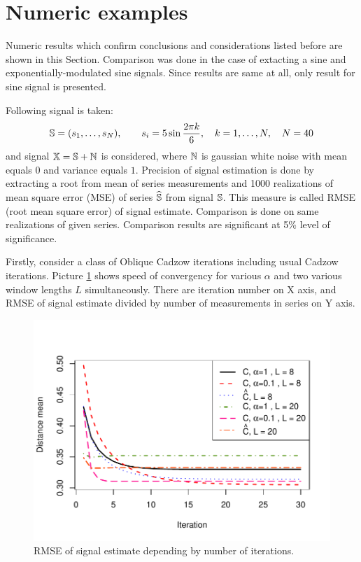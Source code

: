 \documentclass[12pt,a4paper,fleqn,leqno]{article}
\begin{document}
\section{Numeric examples}
\label{sec:simul}
Numeric results which confirm conclusions and considerations listed before are shown in this Section. Comparison was done in the case of extacting a sine and exponentially-modulated sine signals.
Since results are same at all, only result for sine signal is presented.

Following signal is taken:
\begin{equation*}
\mathbb{S} = (s_{1}, \ldots, s_N), \qquad s_{i} = 5\sin{\frac{2 \pi k}{6}}, \quad k = 1, \ldots, N, \quad N = 40
\end{equation*}
and signal $\mathbb{X} = \mathbb{S} + \mathbb{N}$ is considered, where  $\mathbb{N}$ is gaussian white noise with mean equals $0$ and variance equals $1$. Precision of signal estimation is done by extracting a root from mean of series measurements and 1000 realizations of mean square error (MSE) of series $\widehat{\mathbb{S}}$ from signal $\mathbb{S}$. This measure is called RMSE (root mean square error) of signal estimate. Comparison is done on same realizations of given series. Comparison results are significant at 5\% level of significance.

Firstly, consider a class of Oblique Cadzow iterations including usual Cadzow iterations. Picture \ref{img_cadzowspeed2} shows speed of convergency for various $\alpha$ and two various window lengths $L$ simultaneously. There are iteration number on X axis, and RMSE of signal estimate divided by number of measurements in series on Y axis.

\begin{figure}[!hhh]
\begin{center}
\includegraphics[width = \textwidth]{cadzowspeed_2.pdf}
\caption{RMSE of signal estimate depending by number of iterations.}
\label{img_cadzowspeed2}
\end{center}
\end{figure}
\end{document}
